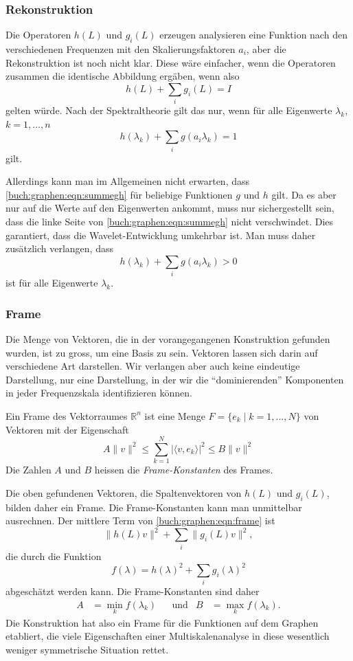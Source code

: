 \subsubsection{Rekonstruktion}
Die Operatoren $h(L)$ und $g_i(L)$ erzeugen analysieren eine Funktion
nach den verschiedenen Frequenzen mit den Skalierungsfaktoren $a_i$,
aber die Rekonstruktion ist noch nicht klar.
Diese wäre einfacher, wenn die Operatoren zusammen die identische
Abbildung ergäben, wenn also
\[
h(L) + \sum_{i}g_i(L)=I
\]
gelten würde.
Nach der Spektraltheorie gilt das nur, wenn für alle Eigenwerte
$\lambda_k$, $k=1,\dots,n$
\begin{equation}
h(\lambda_k) + \sum_ig(a_i\lambda_k)=1
\label{buch:graphen:eqn:summegh}
\end{equation}
gilt.

Allerdings kann man im Allgemeinen nicht erwarten,
dass \ref{buch:graphen:eqn:summegh} für
beliebige Funktionen $g$ und $h$ gilt.
Da es aber nur auf die Werte auf den Eigenwerten ankommt,
muss nur sichergestellt sein, dass 
die linke Seite von \eqref{buch:graphen:eqn:summegh}
nicht verschwindet.
Dies garantiert, dass die Wavelet-Entwicklung umkehrbar ist.
Man muss daher zusätzlich verlangen, dass
\[
h(\lambda_k) + \sum_{i} g(a_i\lambda_k) > 0
\]
ist für alle Eigenwerte $\lambda_k$.

\subsubsection{Frame}
Die Menge von Vektoren, die in der vorangegangenen Konstruktion gefunden
wurden, ist zu gross, um eine Basis zu sein.
Vektoren lassen sich darin auf verschiedene Art darstellen.
Wir verlangen aber auch keine eindeutige Darstellung, nur eine 
Darstellung, in der wir die ``dominierenden'' Komponenten in jeder
Frequenzskala identifizieren können.

\begin{definition}
\label{buch:graphen:def:frame}
Ein Frame des Vektorraumes $\mathbb{R}^n$ ist eine Menge
$F=\{e_k\;|\; k=1,\dots,N\}$ von Vektoren mit der Eigenschaft
\begin{equation}
A\|v\|^2
\le
\sum_{k=1}^N  |\langle v,e_k\rangle|^2
\le
B\|v\|^2
\label{buch:graphen:eqn:frame}
\end{equation}
Die Zahlen $A$  und $B$ heissen die {\em Frame-Konstanten} des Frames.
\end{definition}

Die oben gefundenen Vektoren, die Spaltenvektoren von $h(L)$ und $g_i(L)$,
bilden daher ein Frame.
Die Frame-Konstanten kann man unmittelbar ausrechnen.
Der mittlere Term von \eqref{buch:graphen:eqn:frame} ist 
\[
\|h(L) v\|^2
+
\sum_{i} \|g_i(L)v\|^2,
\]
die durch die Funktion
\[
f(\lambda)
=
h(\lambda)^2 + \sum_i g_i(\lambda)^2
\]
abgeschätzt werden kann.
Die Frame-Konstanten sind daher
\[
\begin{aligned}
A&=\min_{k} f(\lambda_k)
&
&\text{und}&
B&=\max_{k} f(\lambda_k).
\end{aligned}
\]
Die Konstruktion hat also ein Frame für die Funktionen auf dem Graphen
etabliert, die viele Eigenschaften einer Multiskalenanalyse in diese
wesentlich weniger symmetrische Situation rettet.




